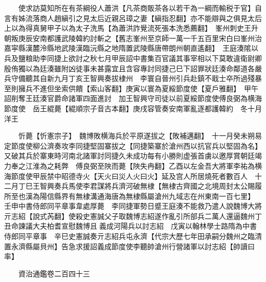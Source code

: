 　　使求訪莫知所在有茶綱役人蕭洪【凡茶商販茶各以若干為一綱而輸税于官】自言有姊流落商人趙縝引之見太后近親呂璋之妻【縝指忍翻】亦不能辯與之俱見太后上以為得真舅甲子以為太子洗馬【為蕭洪詐覺流死張本洗悉薦翻】　峯州刺史王升朝叛庚辰安南都護武陵韓約討斬之【舊志峯州至京師一萬一千五百里宋白曰峯州治嘉寜縣漢麓泠縣地武陵漢臨沅縣之地隋置武陵縣唐帶朗州朝直遙翻】　王庭湊隂以兵及鹽粮助李同捷上欲討之秋七月甲辰詔中書集百官議其事宰相以下莫敢違衛尉卿殷侑獨以為廷湊雖附凶徒事未甚露宜且含容專討同捷己巳下詔罪狀廷湊命鄰道各嚴兵守備聽其自新九月丁亥王智興奏拔棣州　李寰自晉州引兵赴鎮不戢士卒所過殘暴至則擁兵不進但坐索供饋【索山客翻】庚寅以寰為夏綏節度使【夏戶雅翻】　甲午詔削奪王廷湊官爵命諸軍四面進討　加王智興守司徒以前夏綏節度使傅良弼為横海節度使　岳王緄薨【緄順宗子音古本翻】庚戌容管奏安南軍亂逐都護韓約　冬十月洋王

　　忻薨【忻憲宗子】　魏博敗横海兵於平原遂拔之【敗補邁翻】　十一月癸未朔易定節度使柳公濟奏攻李同捷堅固寨拔之【同捷築寨於滄州西以抗官兵以堅固為名】又破其兵於寨東時河南北諸軍討同捷久未成功每有小勝則虚張首虜以邀厚賞朝廷竭力奉之江淮為之耗弊　傅良弼至陜而薨【陜失冉翻】乙酉以左金吾大將軍李祐為横海節度使甲辰禁中昭德寺火【天火曰災人火曰火】延及宫人所居燒死者數百人　十二月丁巳王智興奏兵馬使李君謀將兵濟河破無棣【無棣古齊國之北境周封太公賜履所至也漢為陽信縣界有無棣溝通海唐為無棣縣屬滄州九域志在州東南一百七里】　壬申中書侍郎同平章事韋處厚薨　李同捷軍勢日蹙王庭湊不能救乃遣人說魏博大將亓志紹【說式芮翻】使殺史憲誠父子取魏博志紹遂作亂引所部兵二萬人還逼魏州丁丑命諫議大夫柏耆宣慰魏博且義成河陽兵以討志紹　戊寅以翰林學士路隋為中書侍郎同平章事　辛巳史憲誠奏亓志紹兵屯永濟【代宗大歷七年田承嗣分魏州之臨清置永濟縣屬貝州】告急求援詔義成節度使李聽帥滄州行營諸軍以討志紹【帥讀曰率】

　　資治通鑑卷二百四十三  
    


 


 



 

 
  







 


　　
　　
　
　
　


　　

　















